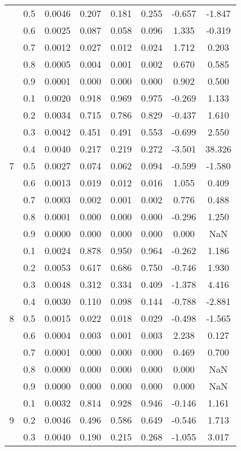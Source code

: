 \documentclass[11pt,a4paper]{report}
\begin{document}
\begin{longtable}{ | c | c || c | c | c | c | c | c | }
 & 0.5 & 0.0046 & 0.207 & 0.181 & 0.255 & -0.657 & -1.847 \\
 & 0.6 & 0.0025 & 0.087 & 0.058 & 0.096 & 1.335 & -0.319 \\
 & 0.7 & 0.0012 & 0.027 & 0.012 & 0.024 & 1.712 & 0.203 \\
 & 0.8 & 0.0005 & 0.004 & 0.001 & 0.002 & 0.670 & 0.585 \\
 & 0.9 & 0.0001 & 0.000 & 0.000 & 0.000 & 0.902 & 0.500 \\
 \hline
\multirow{9}{*}{7} & 0.1 & 0.0020 & 0.918 & 0.969 & 0.975 & -0.269 & 1.133 \\
 & 0.2 & 0.0034 & 0.715 & 0.786 & 0.829 & -0.437 & 1.610 \\
 & 0.3 & 0.0042 & 0.451 & 0.491 & 0.553 & -0.699 & 2.550 \\
 & 0.4 & 0.0040 & 0.217 & 0.219 & 0.272 & -3.501 & 38.326 \\
 & 0.5 & 0.0027 & 0.074 & 0.062 & 0.094 & -0.599 & -1.580 \\
 & 0.6 & 0.0013 & 0.019 & 0.012 & 0.016 & 1.055 & 0.409 \\
 & 0.7 & 0.0003 & 0.002 & 0.001 & 0.002 & 0.776 & 0.488 \\
 & 0.8 & 0.0001 & 0.000 & 0.000 & 0.000 & -0.296 & 1.250 \\
 & 0.9 & 0.0000 & 0.000 & 0.000 & 0.000 & 0.000 & NaN \\
 \hline
\multirow{9}{*}{8} & 0.1 & 0.0024 & 0.878 & 0.950 & 0.964 & -0.262 & 1.186 \\
 & 0.2 & 0.0053 & 0.617 & 0.686 & 0.750 & -0.746 & 1.930 \\
 & 0.3 & 0.0048 & 0.312 & 0.334 & 0.409 & -1.378 & 4.416 \\
 & 0.4 & 0.0030 & 0.110 & 0.098 & 0.144 & -0.788 & -2.881 \\
 & 0.5 & 0.0015 & 0.022 & 0.018 & 0.029 & -0.498 & -1.565 \\
 & 0.6 & 0.0004 & 0.003 & 0.001 & 0.003 & 2.238 & 0.127 \\
 & 0.7 & 0.0001 & 0.000 & 0.000 & 0.000 & 0.469 & 0.700 \\
 & 0.8 & 0.0000 & 0.000 & 0.000 & 0.000 & 0.000 & NaN \\
 & 0.9 & 0.0000 & 0.000 & 0.000 & 0.000 & 0.000 & NaN \\
 \hline
\multirow{9}{*}{9} & 0.1 & 0.0032 & 0.814 & 0.928 & 0.946 & -0.146 & 1.161 \\
 & 0.2 & 0.0046 & 0.496 & 0.586 & 0.649 & -0.546 & 1.713 \\
 & 0.3 & 0.0040 & 0.190 & 0.215 & 0.268 & -1.055 & 3.017 \\

\end{longtable}
\end{document}
